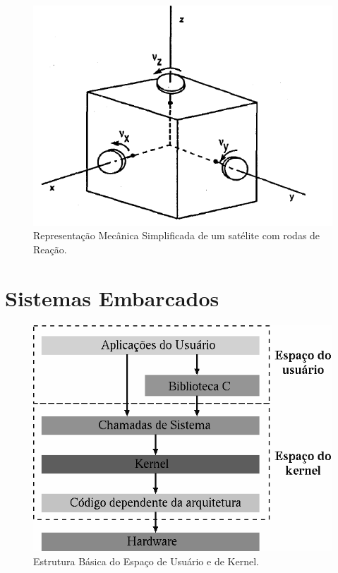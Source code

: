 \begin{figure}[htb]
  \caption{Representação Mecânica Simplificada de um satélite com rodas de Reação.}
  \begin{center}
      \includegraphics[scale=0.75]{img/satellite_controlhand_p1306}
  \end{center}
  \label{fig:satellite_controlhand_p1306}
\end{figure}

\section{Sistemas Embarcados}

\begin{figure}[htb]
  \caption{Estrutura Básica do Espaço de Usuário e de Kernel.}
  \begin{center}
      \includegraphics[scale=0.75]{img/kernel_user_space}
  \end{center}
  \label{fig:kernel_user_space}
\end{figure}


